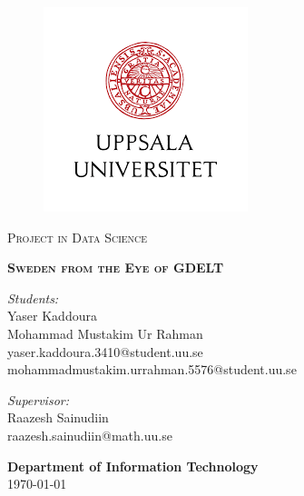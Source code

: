\documentclass[a4, 11pt]{article}
\newcommand{\thesistitle}{Sweden from the Eye of GDELT}
\begin{document}
\begin{titlepage}

\begin{figure}
   \vspace{0.2in}
   \begin{center}
     \includegraphics[scale=0.5]{Images/UU_LOGO.png}
   \end{center}
\end{figure}

\thispagestyle{fancy}

\vspace{1in}

\center

\textsc{\large Project in Data Science }

\vspace{0.6in}

\noindent\vspace{0.1in}\makebox[\linewidth]{\rule{\linewidth}{1.2pt}}
\textsc{ \textbf{\large \thesistitle{}}}
\noindent\makebox[\linewidth]{\rule{\linewidth}{1.2pt}}

\vspace{0.5in}

 \begin{minipage}{0.58\textwidth}
    \begin{flushleft}
        \textit{Students:} \\
        Yaser Kaddoura \\
        Mohammad Mustakim Ur Rahman\\
        yaser.kaddoura.3410@student.uu.se \\
        mohammadmustakim.urrahman.5576@student.uu.se \\
    \end{flushleft}
 \end{minipage}
\begin{minipage}{0.38\textwidth}
    \begin{flushright}
    \textit{Supervisor:} \\
    Raazesh Sainudiin \\
    raazesh.sainudiin@math.uu.se
    \end{flushright}
\end{minipage}

\vspace{1.6in}

\textbf{\large Department of Information Technology} \\

\today

\end{titlepage}
\end{document}
